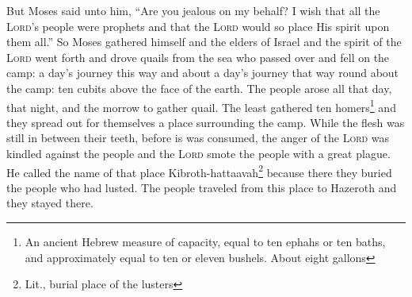 \begin{enumerate}[align=center]
     But Moses said unto him, ``Are you jealous on my behalf? I wish that all the \textsc{Lord}'s people were prophets and that the \textsc{Lord} would so place His spirit upon them all.''%
     So Moses gathered himself and the elders of Israel%
     and the spirit of the \textsc{Lord} went forth and drove quails from the sea who passed over and fell on the camp: a day's journey this way and about a day's journey that way round about the camp: ten cubits above the face of the earth.%
     The people arose all that day, that night, and the morrow to gather quail. The least gathered ten homers\footnote{An ancient Hebrew measure of capacity, equal to ten ephahs or ten baths, and approximately equal to ten or eleven bushels. About eight gallons} and they spread out for themselves a place surrounding the camp.%
     While the flesh was still in between their teeth, before is was consumed, the anger of the \textsc{Lord} was kindled against the people and the \textsc{Lord} smote the people with a great plague.%
     He called the name of that place Kibroth-hattaavah\footnote{Lit., burial place of the lusters} because there they buried the people who had lusted.%
     The people traveled from this place to Hazeroth and they stayed there.%
\end{enumerate}

